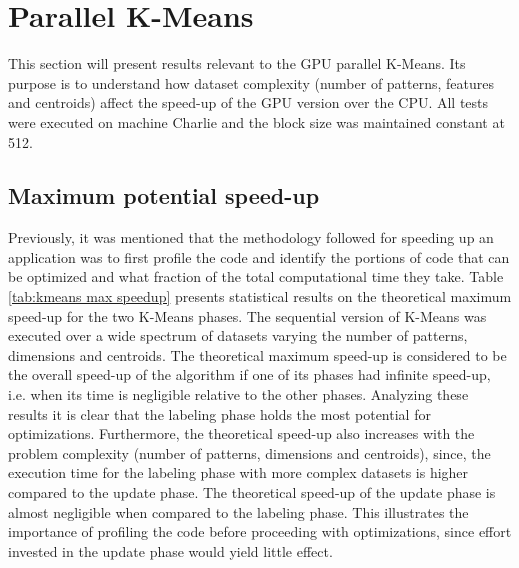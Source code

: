 \section{Parallel K-Means}
\label{sec:parallel kmeans}

This section will present results relevant to the GPU parallel K-Means.
Its purpose is to understand how dataset complexity (number of patterns, features and centroids) affect the speed-up of the GPU version over the CPU.
All tests were executed on machine Charlie and the block size was maintained constant at 512.

\subsection{Maximum potential speed-up}

Previously, it was mentioned that the methodology followed for speeding up an application was to first profile the code and identify the portions of code that can be optimized and what fraction of the total computational time they take.
Table \ref{tab:kmeans max speedup} presents statistical results on the theoretical maximum speed-up for the two K-Means phases.
The sequential version of K-Means was executed over a wide spectrum of datasets varying the number of patterns, dimensions and centroids. %
The theoretical maximum speed-up is considered to be the overall speed-up of the algorithm if one of its phases had infinite speed-up, i.e. when its time is negligible relative to the other phases.
Analyzing these results it is clear that the labeling phase holds the most potential for optimizations.
Furthermore, the theoretical speed-up also increases with the problem complexity (number of patterns, dimensions and centroids), since, the execution time for the labeling phase with more complex datasets is higher compared to the update phase.
The theoretical speed-up of the update phase is almost negligible when compared to the labeling phase.
This illustrates the importance of profiling the code before proceeding with optimizations, since effort invested in the update phase would yield little effect.

